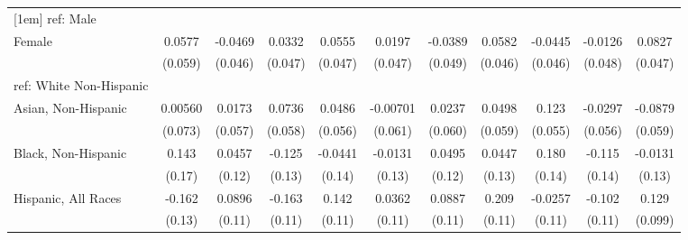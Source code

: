 \begin{table}[htbp]
\begin{tabular}{l*{10}{c}}
[1em]
ref: Male&                     &                     &                     &                     &                     &                     &                     &                     &                     &                     \\
[1em]
Female&      0.0577         &     -0.0469         &      0.0332         &      0.0555         &      0.0197         &     -0.0389         &      0.0582         &     -0.0445         &     -0.0126         &      0.0827\sym{*}  \\
  &     (0.059)         &     (0.046)         &     (0.047)         &     (0.047)         &     (0.047)         &     (0.049)         &     (0.046)         &     (0.046)         &     (0.048)         &     (0.047)         \\
[1em]
ref: White Non-Hispanic&                     &                     &                     &                     &                     &                     &                     &                     &                     &                     \\
[1em]
Asian, Non-Hispanic&     0.00560         &      0.0173         &      0.0736         &      0.0486         &    -0.00701         &      0.0237         &      0.0498         &       0.123\sym{**} &     -0.0297         &     -0.0879         \\
  &     (0.073)         &     (0.057)         &     (0.058)         &     (0.056)         &     (0.061)         &     (0.060)         &     (0.059)         &     (0.055)         &     (0.056)         &     (0.059)         \\
[1em]
Black, Non-Hispanic&       0.143         &      0.0457         &      -0.125         &     -0.0441         &     -0.0131         &      0.0495         &      0.0447         &       0.180         &      -0.115         &     -0.0131         \\
  &      (0.17)         &      (0.12)         &      (0.13)         &      (0.14)         &      (0.13)         &      (0.12)         &      (0.13)         &      (0.14)         &      (0.14)         &      (0.13)         \\
[1em]
Hispanic, All Races&      -0.162         &      0.0896         &      -0.163         &       0.142         &      0.0362         &      0.0887         &       0.209\sym{*}  &     -0.0257         &      -0.102         &       0.129         \\
  &      (0.13)         &      (0.11)         &      (0.11)         &      (0.11)         &      (0.11)         &      (0.11)         &      (0.11)         &      (0.11)         &      (0.11)         &     (0.099)         \\

\end{tabular}
\end{table}
